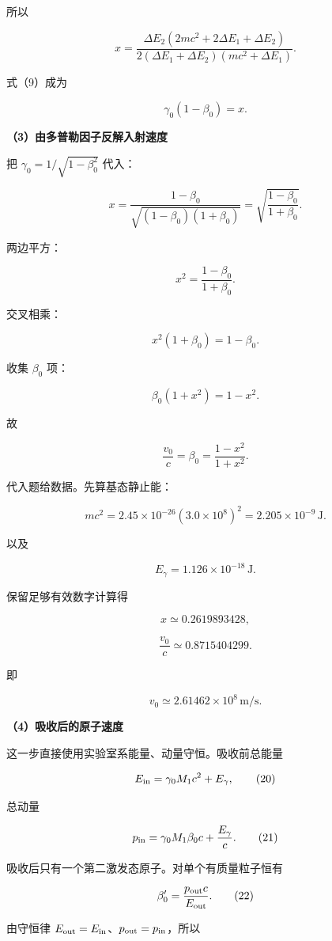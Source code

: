 \documentclass[12pt,a4paper,UTF8]{ctexart}
\begin{document}
所以

\[
\boxed{
x=
\frac{\Delta E_2(2mc^2+2\Delta E_1+\Delta E_2)}
{2(\Delta E_1+\Delta E_2)(mc^2+\Delta E_1)}
}.
\tag{12}
\]

式（9）成为

\[
\gamma_0(1-\beta_0)=x.
\tag{13}
\]

\textbf{（3）由多普勒因子反解入射速度}

把 \(\gamma_0=1/\sqrt{1-\beta_0^2}\) 代入：

\[
x
=\frac{1-\beta_0}{\sqrt{(1-\beta_0)(1+\beta_0)}}
=\sqrt{\frac{1-\beta_0}{1+\beta_0}}.
\tag{14}
\]

两边平方：

\[
x^2=\frac{1-\beta_0}{1+\beta_0}.
\]

交叉相乘：

\[
x^2(1+\beta_0)=1-\beta_0.
\]

收集 \(\beta_0\) 项：

\[
\beta_0(1+x^2)=1-x^2.
\]

故

\[
\boxed{
\frac{v_0}{c}=\beta_0=\frac{1-x^2}{1+x^2}
}.
\tag{15}
\]

代入题给数据。先算基态静止能：

\[
mc^2
=2.45\times10^{-26}(3.0\times10^8)^2
=2.205\times10^{-9}\,\mathrm J.
\tag{16}
\]

以及

\[
E_\gamma=1.126\times10^{-18}\,\mathrm J.
\tag{17}
\]

保留足够有效数字计算得

\[
x\simeq0.2619893428,
\]

\[
\boxed{
\frac{v_0}{c}\simeq0.8715404299
}.
\tag{18}
\]

即

\[
\boxed{
v_0\simeq2.61462\times10^8\,\mathrm{m/s}
}.
\tag{19}
\]

\textbf{（4）吸收后的原子速度}

这一步直接使用实验室系能量、动量守恒。吸收前总能量

\[
E_{\rm in}=\gamma_0M_1c^2+E_\gamma,
\tag{20}
\]

总动量

\[
p_{\rm in}=\gamma_0M_1\beta_0c+\frac{E_\gamma}{c}.
\tag{21}
\]

吸收后只有一个第二激发态原子。对单个有质量粒子恒有

\[
\beta_0'=\frac{p_{\rm out}c}{E_{\rm out}}.
\tag{22}
\]

由守恒律 \(E_{\rm out}=E_{\rm in}\)、\(p_{\rm out}=p_{\rm in}\)，所以
\end{document}
